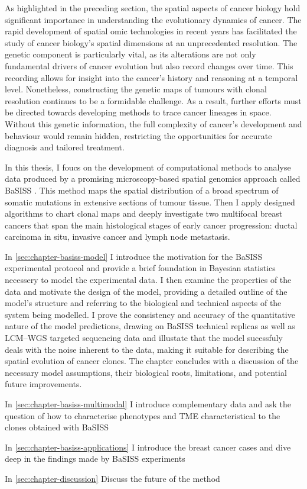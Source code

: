 As highlighted in the preceding section, the spatial aspects of cancer biology hold significant importance in understanding the evolutionary dynamics of cancer. The rapid development of spatial omic technologies in recent years has facilitated the study of cancer biology's spatial dimensions at an unprecedented resolution. The genetic component is particularly vital, as its alterations are not only fundamental drivers of cancer evolution but also record changes over time. This recording allows for insight into the cancer's history and reasoning at a temporal level. Nonetheless, constructing the genetic maps of tumours with clonal resolution continues to be a formidable challenge. As a result, further efforts must be directed towards developing methods to trace cancer lineages in space. Without this genetic information, the full complexity of cancer's development and behaviour would remain hidden, restricting the opportunities for accurate diagnosis and tailored treatment.

In this thesis, I foucs on the development of computational methods to analyse data produced by a promising microscopy-based spatial genomics approach called \acf{BaSISS} \parencite{Lomakin2022-ks}. This method maps the spatial distribution of a broad spectrum of somatic mutations in extensive sections of tumour tissue. Then I apply designed algorithms to chart clonal maps and deeply investigate two multifocal breast cancers that span the main histological stages of early cancer progression: ductal carcinoma in situ, invasive cancer and lymph node metastasis. 

In \cref{sec:chapter-basiss-model} I introduce the motivation for the \ac{BaSISS} experimental protocol and provide a brief foundation in Bayesian statistics necessery to model the experimental data. I then examine the properties of the data and motivate the design of the model, providing a detailed outline of the model's structure and referring to the biological and technical aspects of the system being modelled. I prove the consistency and accuracy of the quantitative nature of the model predictions, drawing on \ac{BaSISS} technical replicas as well as \ac{LCM}–\ac{WGS} targeted sequencing data and illustate that the model sucessfuly deals with the noise inherent to the data, making it suitable for describing the spatial evolution of cancer clones. The chapter concludes with a discussion of the necessary model assumptions, their biological roots, limitations, and potential future improvements.

In \cref{sec:chapter-basiss-multimodal} I introduce complementary data and ask the question of how to characterise phenotypes and TME characteristical to the clones obtained with BaSISS 

In \cref{sec:chapter-basiss-applications} I introduce the breast cancer cases and dive deep in the findings made by BaSISS experiments

In \cref{sec:chapter-discussion} Discuss the future of the method









